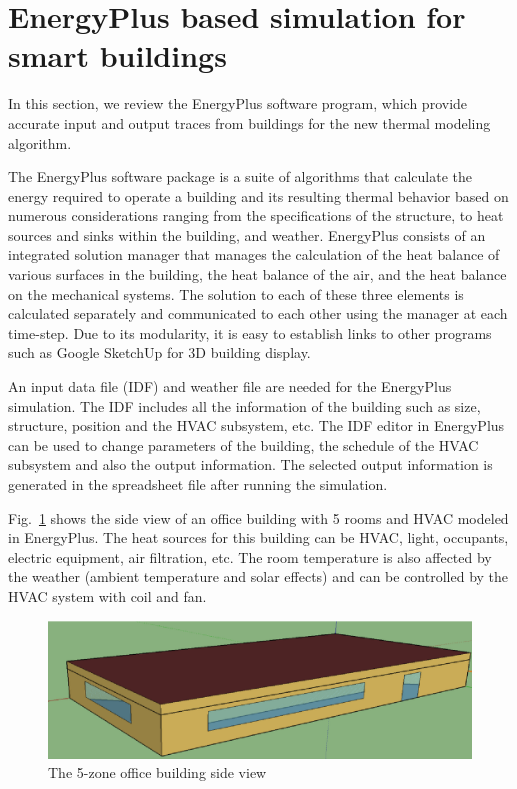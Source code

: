 \section{EnergyPlus based simulation for smart buildings}

\label{sec:energy_plus_review}

In this section, we review the EnergyPlus software program, which provide
accurate input and output traces from buildings for the new thermal
modeling algorithm.

The EnergyPlus software package is a suite of
algorithms that calculate the energy required to operate a building
and its resulting thermal behavior based on numerous considerations
ranging from the specifications of the structure, to heat sources and
sinks within the building, and weather. EnergyPlus consists of  an integrated solution
manager that manages the calculation of the heat balance of various
surfaces in the building, the heat balance of the air, and the heat
balance on the mechanical systems. The solution to each of these three
elements is calculated separately and communicated to each other
using the manager at each time-step.
Due to its modularity, it is easy to establish links to other programs such as Google SketchUp for 3D building display.

An input data file (IDF) and weather file are needed for the EnergyPlus
simulation. The IDF includes all the information of the building such
as size, structure, position and the HVAC subsystem, etc. The IDF
editor in EnergyPlus can be used to change parameters of the building, the
schedule of the HVAC subsystem and also the output information. The
selected output information is generated in the spreadsheet file
after running the simulation.

Fig.~\ref{fig:5zone} shows the side view of an office building
with 5 rooms and HVAC modeled in EnergyPlus. The heat sources for this building
can be HVAC, light, occupants, electric equipment, air filtration, etc. The
room temperature is also affected by the weather (ambient temperature and solar
effects) and can be controlled by the HVAC system with coil
and fan.

\begin{figure}[t]
    \centering
    \includegraphics[width=0.7\columnwidth]{figs/energyplus_review/5zone-a}
    \caption{The 5-zone office building side view}
    \label{fig:5zone}
\end{figure}

